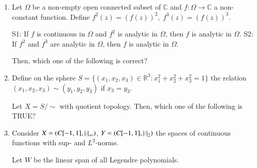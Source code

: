 \documentclass[journal,12pt,onecolumn]{IEEEtran}
\theoremstyle{remark}
\begin{document}
\begin{enumerate}
\item Let $\Omega$ be a non-empty open connected subset of $\mathbb{C}$ and $f:\Omega\to\mathbb{C}$ a non-constant function. Define $f^2(z)=(f(z))^2, \; f^3(z)=(f(z))^3$.  

S1: If $f$ is continuous in $\Omega$ and $f^2$ is analytic in $\Omega$, then $f$ is analytic in $\Omega$.  
S2: If $f^2$ and $f^3$ are analytic in $\Omega$, then $f$ is analytic in $\Omega$.  

Then, which one of the following is correct?  

\begin{enumerate}
\end{enumerate}
\hfill{}

\item Define on the sphere $S=\{(x_1,x_2,x_3)\in\mathbb{R}^3: x_1^2+x_2^2+x_3^2=1\}$ the relation $(x_1,x_2,x_3)\sim(y_1,y_2,y_3)$ if $x_3=y_3$.  

Let $X=S/\sim$ with quotient topology. Then, which one of the following is TRUE?  

\begin{enumerate}
\end{enumerate}
\hfill{}

\item Consider $X=(C[-1,1],\left\vert\cdot\right\vert_\infty)$, $Y=(C[-1,1],\left\vert\cdot\right\vert_2)$ the spaces of continuous functions with sup- and $L^2$-norms.  

Let $W$ be the linear span of all Legendre polynomials.  


\end{enumerate}
\end{document}
